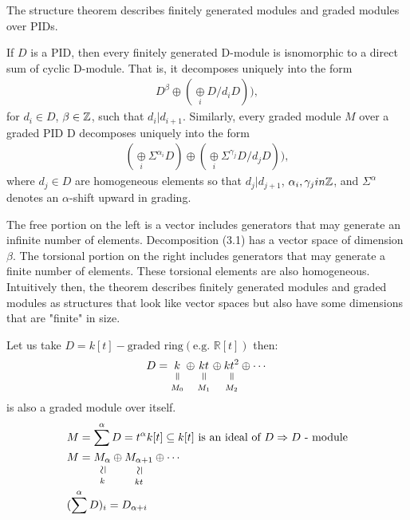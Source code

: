 \documentclass[11pt,a4paper]{report}
\newcommand{\verteq}{\rotatebox{90}{$\,=$}}
\newcommand{\vertsimeq}{\rotatebox{90}{$\,\simeq$}}
\newcommand{\equalto}[2]{\underset{\scriptstyle\overset{\mkern4mu\verteq}{#2}}{#1}}
\newcommand{\simequalto}[2]{\underset{\scriptstyle\overset{\mkern4mu\vertsimeq}{#2}}{#1}}
\begin{document}
              The structure theorem describes finitely generated modules and graded modules over PIDs.
              \begin{thm}  \label{Structure}
              If $D$ is a PID, then every finitely generated D-module is isnomorphic to a direct sum of cyclic D-module. That is, it decomposes uniquely into the form
              \begin{align}
                D^\beta \oplus (\underset{i}{\oplus} D/d_iD)),
              \end{align}
              for $d_i \in D$, $\beta \in \mathbb{Z}$, such that $d_i| d_{i+1}.$ Similarly, every graded module $M$ over a graded PID D decomposes uniquely into the form
               \begin{align}
                (\underset{i}{\oplus} \Sigma^{\alpha_i} D) \oplus (\underset{i}{\oplus} \Sigma ^{\gamma_j} D/d_jD)),
              \end{align}
              where $d_j \in D$ are homogeneous elements so that $d_j|d_{j+1}$, $\alpha_i, \gamma_j in \mathbb{Z}$, and $\Sigma^\alpha$ denotes an $\alpha$-shift upward in grading.
              \end{thm}
              The free portion on the left is a vector includes generators that may generate an infinite number of elements. Decomposition (3.1) has a vector space of dimension $\beta$. The torsional portion on the right includes generators that
               may generate a finite number of elements. These torsional elements are also homogeneous. Intuitively then, the theorem describes finitely generated modules and graded modules as structures that look like vector spaces but also
                have some dimensions that are "finite" in size.
              
             
              \begin{Ex}
               Let us take $D = k[t] - \textrm{graded ring} (\textrm{e.g. } \mathbb{R}[t])$
               then: 
               \[
                D = \equalto{k}{M_0} \oplus \equalto{kt}{M_1} \oplus \equalto{kt^2}{M_2} \oplus \cdots
                \]
                is also a graded module over itself.
              \begin{align*}
                &M = \sum^\alpha D = t^\alpha k[t] \subseteq k[t] \textrm{  is an ideal of } D \Rightarrow D \textrm{ - module}\\
                &M = \simequalto{M_\alpha}{k} \oplus \simequalto{M_{\alpha+1}}{kt} \oplus \cdots\\
                &(\sum^\alpha D)_i = D_{\alpha+i}\\
              \end{align*}
              \end{Ex}
              
\end{document}

